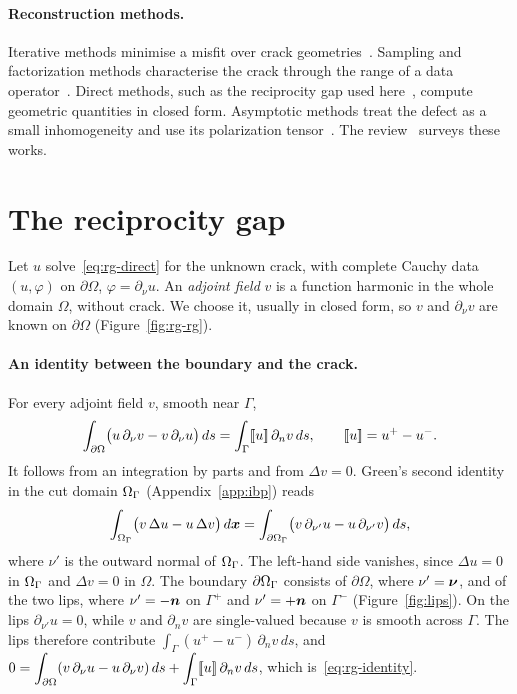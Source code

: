 \paragraph{Reconstruction methods.} Iterative methods minimise a misfit over crack geometries~\cite{SV91,BV94}. Sampling and factorization methods characterise the crack through the range of a data operator~\cite{BHP01}. Direct methods, such as the reciprocity gap used here~\cite{AB96,ABB99,BCM04,BCM05}, compute geometric quantities in closed form. Asymptotic methods treat the defect as a small inhomogeneity and use its polarization tensor~\cite{AK04}. The review~\cite{BV04} surveys these works.

\section{The reciprocity gap}\label{sec:rg-gap}
%
Let $u$ solve~\eqref{eq:rg-direct} for the unknown crack, with complete Cauchy data $(u,\varphi)$ on $\partial\Omega$, $\varphi=\partial_\nu u$. An \emph{adjoint field} $v$ is a function harmonic in the whole domain $\Omega$, without crack. We choose it, usually in closed form, so $v$ and $\partial_\nu v$ are known on $\partial\Omega$ (Figure~\ref{fig:rg-rg}).

\paragraph{An identity between the boundary and the crack.} For every adjoint field $v$, smooth near $\Gamma$,
\begin{equation}\label{eq:rg-identity}
\int_{\partial\Omega}\bigl(u\,\partial_\nu v-v\,\partial_\nu u\bigr)\,ds=\int_\Gamma[\![u]\!]\,\partial_nv\,ds,\qquad [\![u]\!]=u^+-u^- .
\end{equation}
It follows from an integration by parts and from $\Delta v=0$. Green's second identity in the cut domain $\Omega_\Gamma$ (Appendix~\ref{app:ibp}) reads
\[
\int_{\Omega_\Gamma}\bigl(v\,\Delta u-u\,\Delta v\bigr)\,d\bm{x}=\int_{\partial\Omega_\Gamma}\bigl(v\,\partial_{\nu'}u-u\,\partial_{\nu'}v\bigr)\,ds,
\]
where $\nu'$ is the outward normal of $\Omega_\Gamma$. The left-hand side vanishes, since $\Delta u=0$ in $\Omega_\Gamma$ and $\Delta v=0$ in $\Omega$. The boundary $\partial\Omega_\Gamma$ consists of $\partial\Omega$, where $\nu'=\bm{\nu}$, and of the two lips, where $\nu'=-\bm{n}$ on $\Gamma^+$ and $\nu'=+\bm{n}$ on $\Gamma^-$ (Figure~\ref{fig:lips}). On the lips $\partial_{\nu'}u=0$, while $v$ and $\partial_nv$ are single-valued because $v$ is smooth across $\Gamma$. The lips therefore contribute $\displaystyle \int_\Gamma(u^+-u^-)\,\partial_nv\,ds$, and
$\displaystyle 0=\int_{\partial\Omega}(v\,\partial_\nu u-u\,\partial_\nu v)\,ds+\int_\Gamma[\![u]\!]\,\partial_nv\,ds$, which is~\eqref{eq:rg-identity}.

